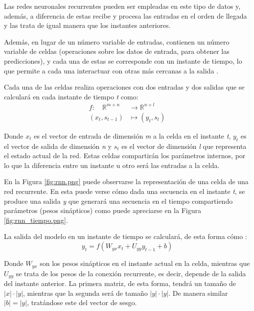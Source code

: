Las redes neuronales recurrentes pueden ser empleadas en este tipo de datos y, además, a diferencia de estas recibe y procesa las 
entradas en el orden de llegada y las trata de igual manera que los instantes anteriores.

Además, en lugar de un número variable de entradas, contienen un número variable de celdas (operaciones sobre los datos de entrada, 
para obtener las predicciones), y cada una de estas se corresponde con un 
instante de tiempo, lo que permite a cada una interactuar con otras más cercanas a la salida \cite{book:aggarwal2018}.

Cada una de las celdas realiza operaciones con dos entradas y dos salidas que se calculará en cada instante de tiempo \textit{t} como:
\begin{equation}
    \begin{aligned}
    f: \quad \mathbb{R}^{m+n} & \rightarrow \mathbb{R}^{n+l} \\
    \left(x_t, s_{t-1}\right) & \mapsto\left(y_t, s_t\right)
    \end{aligned}
\end{equation}

Donde \(x_t\) es el vector de entrada de dimensión \textit{m} a la celda en el instante \textit{t}, \(y_{t}\) es el vector de salida de 
dimensión \textit{n} y \(s_{t}\) es el vector de dimensión \textit{l} que representa el estado actual de la red.
Estas celdas compartirán los parámetros internos, por lo que la diferencia entre un instante u otro será las entradas a la celda.


En la Figura \ref{fig:rnn.png} puede observarse la representación de una celda de una red recurrente. En
esta puede verse cómo dada una secuencia en el instante \textit{t}, se produce una salida 
\textit{y} que generará una secuencia en el tiempo compartiendo parámetros (pesos sinápticos) como puede apreciarse
en la Figura \ref{fig:rnn_tiempo.png}.


La salida del modelo en un instante de tiempo se calculará, de esta forma cómo \cite{book:rue2019}:
\begin{equation}
    y_t = f(W_{yx}x_t + U_{yy} y_{t-1} + b) 
\end{equation}

Donde \(W_{yx}\) son los pesos sinápticos en el instante actual en la celda, mientras que \(U_{yy}\) se
trata de los pesos de la conexión recurrente, es decir, depende de la salida del instante anterior.
La primera matriz, de esta forma, tendrá un tamaño de \(|x| \cdot |y|\), mientras que la segunda
será de tamaño \(|y| \cdot  |y|\). De manera similar \(|b| = |y|\), tratándose este del vector de sesgo.

